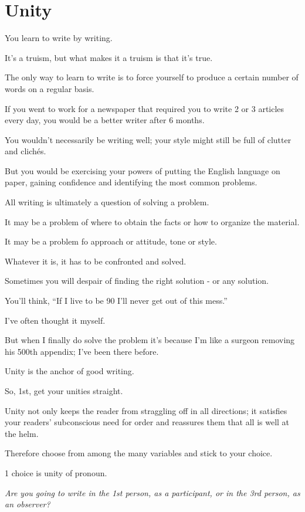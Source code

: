 \documentclass{book}
\numberwithin{equation}{section}
\begin{document}
\chapter{Unity}

You learn to write by writing.

It's a truism, but what makes it a truism is that it's true.

The only way to learn to write is to force yourself to produce a certain number of words on a regular basis.

If you went to work for a newspaper that required you to write 2 or 3 articles every day, you would be a better writer after 6 months.

You wouldn't necessarily be writing well; your style might still be full of clutter and clich\'es.

But you would be exercising your powers of putting the English language on paper, gaining confidence and identifying the most common problems.

All writing is ultimately a question of solving a problem.

It may be a problem of where to obtain the facts or how to organize the material.

It may be a problem fo approach or attitude, tone or style.

Whatever it is, it has to be confronted and solved.

Sometimes you will despair of finding the right solution - or any solution.

You'll think, ``If I live to be 90 I'll never get out of this mess.''

I've often thought it myself.

But when I finally do solve the problem it's because I'm like a surgeon removing his 500th appendix; I've been there before.

%
Unity is the anchor of good writing.

So, 1st, get your unities straight.

Unity not only keeps the reader from straggling off in all directions; it satisfies your readers' subconscious need for order and reassures them that all is well at the helm.

Therefore choose from among the many variables and stick to your choice.

%
1 choice is unity of pronoun.

\textit{Are you going to write in the 1st person, as a participant, or in the 3rd person, as an observer?}
\end{document}

